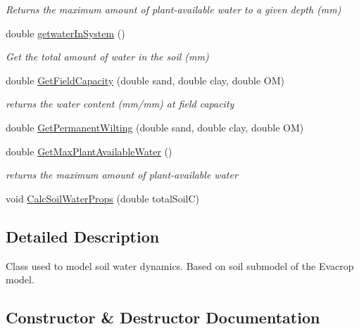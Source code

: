 \begin{DoxyCompactItemize}
\begin{DoxyCompactList}\small\item\em Returns the maximum amount of plant-\/available water to a given depth (mm) \end{DoxyCompactList}\item 
double \mbox{\hyperlink{classsimplesoil_model_1_1simple_soil_a28e0b5547e5728fee34db025abf7d9de}{getwater\+In\+System}} ()
\begin{DoxyCompactList}\small\item\em Get the total amount of water in the soil (mm) \end{DoxyCompactList}\item 
double \mbox{\hyperlink{classsimplesoil_model_1_1simple_soil_a4ba9c7c0f072654666128bc23e3693a2}{Get\+Field\+Capacity}} (double sand, double clay, double OM)
\begin{DoxyCompactList}\small\item\em returns the water content (mm/mm) at field capacity \end{DoxyCompactList}\item 
double \mbox{\hyperlink{classsimplesoil_model_1_1simple_soil_aa2d3de5234f4eabc596b74af6ec7b4d2}{Get\+Permanent\+Wilting}} (double sand, double clay, double OM)
\item 
double \mbox{\hyperlink{classsimplesoil_model_1_1simple_soil_a1b662cb49ffb1fed83a337ce86dbebc6}{Get\+Max\+Plant\+Available\+Water}} ()
\begin{DoxyCompactList}\small\item\em returns the maximum amount of plant-\/available water \end{DoxyCompactList}\item 
void \mbox{\hyperlink{classsimplesoil_model_1_1simple_soil_ac52b9f1e6b4007ff4b24c8a45816ce74}{Calc\+Soil\+Water\+Props}} (double total\+SoilC)
\end{DoxyCompactItemize}


\subsection{Detailed Description}
Class used to model soil water dynamics. Based on soil submodel of the Evacrop model. 

\subsection{Constructor \& Destructor Documentation}
\mbox{\label{classsimplesoil_model_1_1simple_soil_a06e8097b093bfdc37b57abe418d8ca5f}} 
